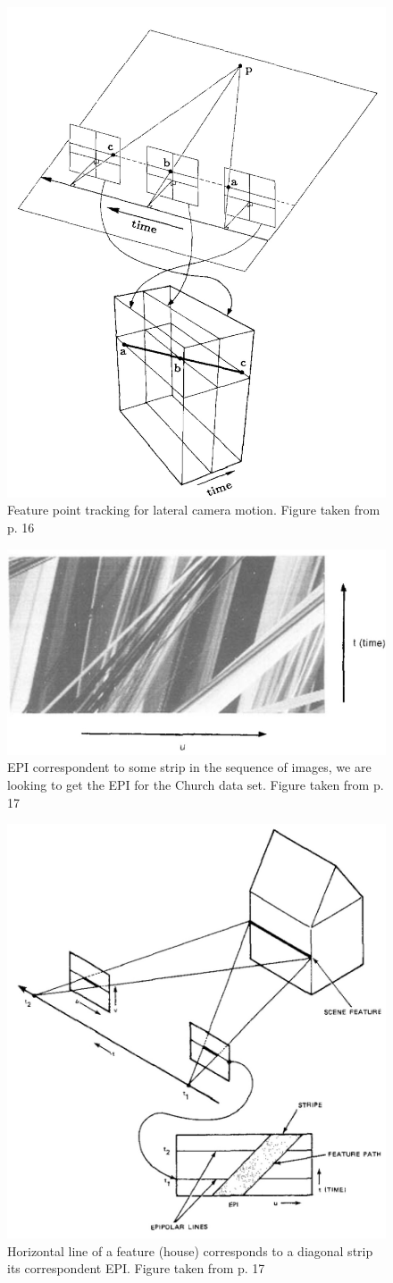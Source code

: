\begin{figure}[h!]
\centering
\includegraphics[width = 0.6 \textwidth]{./Diagrams/lateral_motion_epi.jpg}
\caption{Feature point tracking for lateral camera motion. Figure taken from \cite{Bolles} p. 16}
\label{lateral_motion_epi}
\end{figure}

\begin{figure}[h!]
\centering
\includegraphics[width = 0.8 \textwidth]{./Diagrams/EPI_bolles.jpg}
\caption{EPI correspondent to some strip in the sequence of images, we are looking to get the EPI for the Church data set. Figure taken from \cite{Bolles} p. 17}
\label{EPI_bolles}
\end{figure}

\begin{figure}[h!]
\centering
\includegraphics[width = 0.6 \textwidth]{./Diagrams/Feature_EPI_bolles.jpg}
\caption{Horizontal line of a feature (house) corresponds to a diagonal strip its correspondent EPI\@. Figure taken from \cite{Bolles} p. 17}
\label{Feature_EPI_bolles}
\end{figure}


